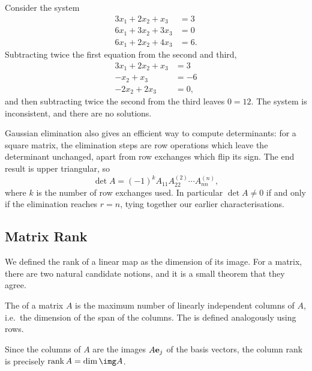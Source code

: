 \documentclass[a4paper]{scrartcl}
\newcommand{\rank}{\operatorname{rank}}
\begin{document}
\begin{example}
	Consider the system
	\begin{align*}
		3x_1 + 2x_2 + x_3 &= 3 \\
		6x_1 + 3x_2 + 3x_3 &= 0 \\
		6x_1 + 2x_2 + 4x_3 &= 6.
	\end{align*}
	Subtracting twice the first equation from the second and third,
	\begin{align*}
		3x_1 + 2x_2 + x_3 &= 3 \\
		- x_2 + x_3 &= -6 \\
		- 2x_2 + 2x_3 &= 0,
	\end{align*}
	and then subtracting twice the second from the third leaves $0 = 12$. The system is inconsistent, and there are no solutions.
\end{example}

Gaussian elimination also gives an efficient way to compute determinants: for a square matrix, the elimination steps are row operations which leave the determinant unchanged, apart from row exchanges which flip its sign. The end result is upper triangular, so
$$
\det A = (-1)^k A_{11}A^{(2)}_{22}\cdots A^{(n)}_{nn},
$$
where $k$ is the number of row exchanges used. In particular $\det A \neq 0$ if and only if the elimination reaches $r = n$, tying together our earlier characterisations.

\subsection{Matrix Rank}

We defined the rank of a linear map as the dimension of its image. For a matrix, there are two natural candidate notions, and it is a small theorem that they agree.

\begin{definition}
	The  of a matrix $A$ is the maximum number of linearly independent columns of $A$, i.e.\ the dimension of the span of the columns. The  is defined analogously using rows.
\end{definition}

Since the columns of $A$ are the images $A\mathbf{e}_j$ of the basis vectors, the column rank is precisely $\rank A = \dim \img A$.
\end{document}
